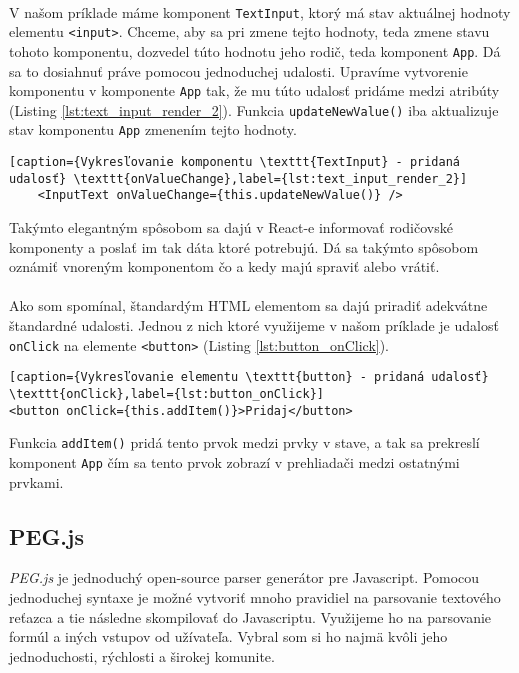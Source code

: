 \paragraph{}
V našom príklade máme komponent \texttt{TextInput}, ktorý má stav aktuálnej hodnoty elementu \texttt{<input>}. Chceme, aby sa pri zmene tejto hodnoty, teda zmene stavu tohoto komponentu, dozvedel túto hodnotu jeho rodič, teda komponent \texttt{App}. Dá sa to dosiahnuť práve pomocou jednoduchej udalosti. Upravíme vytvorenie komponentu v komponente \texttt{App} tak, že mu túto udalosť pridáme medzi atribúty (Listing \ref{lst:text_input_render_2}). Funkcia \texttt{updateNewValue()} iba aktualizuje stav komponentu \texttt{App} zmenením tejto hodnoty.
\begin{lstlisting}[caption={Vykresľovanie komponentu \texttt{TextInput} - pridaná udalosť} \texttt{onValueChange},label={lst:text_input_render_2}]
	<InputText onValueChange={this.updateNewValue()} />
\end{lstlisting}
Takýmto elegantným spôsobom sa dajú v React-e informovať rodičovské komponenty a poslať im tak dáta ktoré potrebujú. Dá sa takýmto spôsobom oznámiť vnoreným komponentom čo a kedy majú spraviť alebo vrátiť.
\paragraph{}
Ako som spomínal, štandardým HTML elementom sa dajú priradiť adekvátne štandardné udalosti. Jednou z nich ktoré využijeme v našom príklade je udalosť \texttt{onClick} na elemente \texttt{<button>} (Listing \ref{lst:button_onClick}). 
\begin{lstlisting}[caption={Vykresľovanie elementu \texttt{button} - pridaná udalosť} \texttt{onClick},label={lst:button_onClick}]
<button onClick={this.addItem()}>Pridaj</button>
\end{lstlisting}
Funkcia \texttt{addItem()} pridá tento prvok medzi prvky v stave, a tak sa prekreslí komponent \texttt{App} čím sa tento prvok zobrazí v prehliadači medzi ostatnými prvkami.

\subsection{PEG.js}
\emph{PEG.js} \cite{pegjs} je jednoduchý open-source parser generátor pre Javascript. Pomocou jednoduchej syntaxe je možné vytvoriť mnoho pravidiel na parsovanie textového reťazca a tie následne skompilovať do Javascriptu. Využijeme ho na parsovanie formúl a iných vstupov od užívateľa. Vybral som si ho najmä kvôli jeho jednoduchosti, rýchlosti a širokej komunite.




